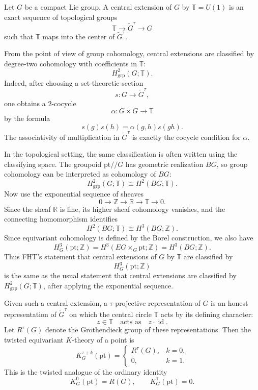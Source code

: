 \documentclass[12pt]{article}
\begin{document}
\begin{example}
    Let $G$ be a compact Lie group. A central extension of $G$ by
    $\mathbb T=U(1)$ is an exact sequence of topological groups
    \[
        \mathbb T\longrightarrow \widetilde G^\tau\longrightarrow G
    \]
    such that $\mathbb T$ maps into the center of $\widetilde G^\tau$.

    From the point of view of group cohomology, central extensions are
    classified by degree-two cohomology with coefficients in $\mathbb T$:
    \[
        H^2_{\mathrm{grp}}(G;\mathbb T).
    \]
    Indeed, after choosing a set-theoretic section
    \[
        s:G\to \widetilde G^\tau,
    \]
    one obtains a $2$-cocycle
    \[
        \alpha:G\times G\to \mathbb T
    \]
    by the formula
    \[
        s(g)s(h)=\alpha(g,h)s(gh).
    \]
    The associativity of multiplication in $\widetilde G^\tau$ is exactly the
    cocycle condition for $\alpha$.

    In the topological setting, the same classification is often written using
    the classifying space. The groupoid $\mathrm{pt}//G$ has geometric
    realization $BG$, so group cohomology can be interpreted as cohomology of
    $BG$:
    \[
        H^2_{\mathrm{grp}}(G;\mathbb T)
        \cong
        H^2(BG;\mathbb T).
    \]
    Now use the exponential sequence of sheaves
    \[
        0\longrightarrow \mathbb Z
        \longrightarrow \mathbb R
        \longrightarrow \mathbb T
        \longrightarrow 0.
    \]
    Since the sheaf $\mathbb R$ is fine, its higher sheaf cohomology vanishes,
    and the connecting homomorphism identifies
    \[
        H^2(BG;\mathbb T)
        \cong
        H^3(BG;\mathbb Z).
    \]
    Since equivariant cohomology is defined by the Borel construction, we also
    have
    \[
        H^3_G(\mathrm{pt};\mathbb Z)
        =
        H^3(EG\times_G\mathrm{pt};\mathbb Z)
        =
        H^3(BG;\mathbb Z).
    \]
    Thus FHT's statement that central extensions of $G$ by $\mathbb T$ are
    classified by
    \[
        H^3_G(\mathrm{pt};\mathbb Z)
    \]
    is the same as the usual statement that central extensions are classified
    by $H^2_{\mathrm{grp}}(G;\mathbb T)$, after applying the exponential
    sequence.

    Given such a central extension, a $\tau$-projective representation of $G$
    is an honest representation of $\widetilde G^\tau$ on which the central
    circle $\mathbb T$ acts by its defining character:
    \[
        z\in \mathbb T
        \quad\text{acts as}\quad
        z\cdot \operatorname{id}.
    \]
    Let $R^\tau(G)$ denote the Grothendieck group of these representations.
    Then the twisted equivariant $K$-theory of a point is
    \[
        K^{\tau+k}_G(\mathrm{pt})
        =
        \begin{cases}
            R^\tau(G), & k=0, \\
            0,         & k=1.
        \end{cases}
    \]
    This is the twisted analogue of the ordinary identity
    \[
        K^0_G(\mathrm{pt})=R(G),
        \qquad
        K^1_G(\mathrm{pt})=0.
    \]


\end{example}
\end{document}
